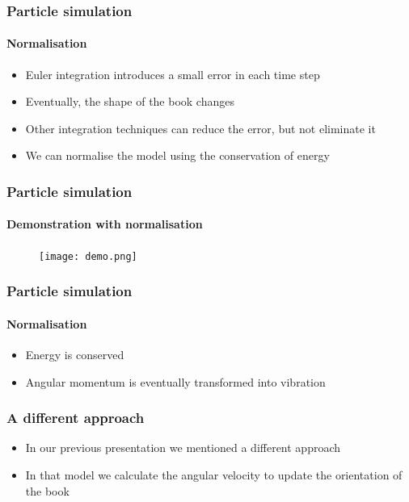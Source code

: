 \documentclass{beamer}
\begin{document}
\begin{frame}
 \frametitle{Particle simulation}
 \framesubtitle{Normalisation}
 \begin{itemize}
  \item Euler integration introduces a small error in each time step
  \item Eventually, the shape of the book changes
  \item Other integration techniques can reduce the error, but not eliminate it
  \item We can normalise the model using the conservation of energy
 \end{itemize}
\end{frame}

\begin{frame}
 \frametitle{Particle simulation}
 \framesubtitle{Demonstration with normalisation}
 \begin{figure}
  \centering
  \texttt{[image: demo.png]}
 \end{figure}
\end{frame}

\begin{frame}
 \frametitle{Particle simulation}
 \framesubtitle{Normalisation}
 \begin{itemize}
  \item Energy is conserved
  \item Angular momentum is eventually transformed into vibration
 \end{itemize}
\end{frame}

\begin{frame}
 \frametitle{A different approach}
 \begin{itemize}
  \item In our previous presentation we mentioned a different approach
  \item In that model we calculate the angular velocity to update the orientation of the book
 \end{itemize}
\end{frame}
\end{document}
